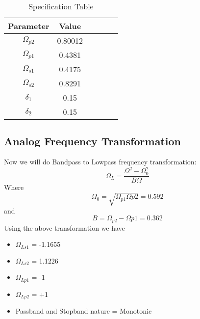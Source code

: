 \documentclass[12pt]{article}
\begin{document}
\begin{table}[h!]
		\begin{center}
		\caption{Specification Table}
		\begin{tabular}{|c|c|c|c|c|c|}
			\hline
			  Parameter & Value \\
			\hline
			 $\Omega_{p2}$& 0.80012\\
			\hline
			 $\Omega_{p1}$ & 0.4381\\
			\hline
			 $\Omega_{s1}$ & 0.4175\\
			\hline
		     $\Omega_{s2}$ & 0.8291\\
			\hline
		    $\delta_1$ & 0.15\\
		    \hline
		    $\delta_2$ & 0.15\\
		    \hline
		\end{tabular}
		\end{center}
\end{table}

\subsection{\textbf{Analog Frequency Transformation}}
Now we will do Bandpass to Lowpass frequency transformation:\\
\begin{equation*}
    \Omega_L = \frac{\Omega^2-\Omega_0^2}{B\Omega}
\end{equation*}
Where \\
\begin{equation*}
    \Omega_0 = \sqrt{\Omega_{p1}\Omega{p2}} = 0.592
\end{equation*}
and\\
\begin{equation*}
    B = \Omega_{p2}-\Omega{p1} = 0.362
\end{equation*}
Using the above transformation we have\\
\begin{itemize}
    \item $\Omega_{Ls1}$ = -1.1655
    \item $\Omega_{Ls2}$ = 1.1226
    \item $\Omega_{Lp1}$ = -1
    \item $\Omega_{Lp2}$ = +1
    \item Passband and Stopband nature = Monotonic
\end{itemize}
\end{document}
